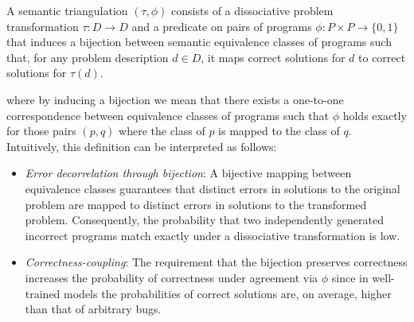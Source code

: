 \documentclass[acmsmall,screen,nonacm]{acmart}
\newcommand\hl[1]{\tcbhighmath{#1}}
\begin{document}
\begin{framed}
    \begin{minipage}[b]{0.55\textwidth}
      \begin{definition}\label{def:triangulation}
        A semantic triangulation $(\tau, \phi)$ consists of a dissociative problem transformation $\tau: D \to D$ and a predicate on pairs of programs $\phi: P\times P \to \{0,1\}$ that induces a bijection between semantic equivalence classes of programs such that, for any problem description $d\in D$, it maps correct solutions for $d$ to correct solutions for $\tau(d)$.
      \end{definition}
    \end{minipage}%
    \hfill
    \begin{minipage}[b]{0.4\textwidth}
      \centering
      {\scriptsize
      }
      \vspace{-5mm}
    \end{minipage}
  \end{framed}
  
\noindent where by inducing a bijection we mean that there exists a one-to-one correspondence between equivalence classes of programs such that $\phi$ holds exactly for those pairs $(p,q)$ where the class of $p$ is mapped to the class of $q$. Intuitively, this definition can be interpreted as follows:
\begin{itemize}
\item \emph{Error decorrelation through bijection}: A bijective mapping between equivalence classes guarantees that distinct errors in solutions to the original problem are mapped to distinct errors in solutions to the transformed problem. Consequently, the probability that two independently generated incorrect programs match exactly under a dissociative transformation is low.
\item \emph{Correctness-coupling}: The requirement that the bijection preserves correctness increases the probability of correctness under agreement via $\phi$ since in well-trained models the probabilities of correct solutions are, on average, higher than that of arbitrary bugs.
\end{itemize}
\end{document}
